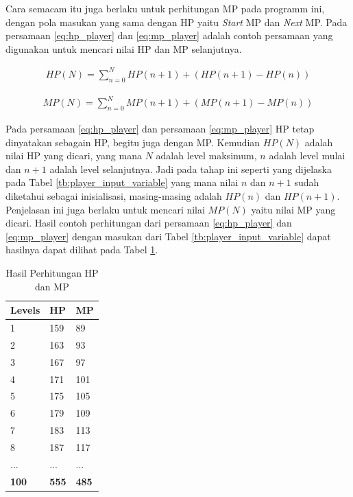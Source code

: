 Cara semacam itu juga berlaku untuk perhitungan MP pada programm ini, dengan pola masukan yang sama dengan HP yaitu \textit{Start} MP dan \textit{Next} MP. Pada persamaan \ref{eq:hp_player} dan \ref{eq:mp_player} adalah contoh persamaan yang digunakan untuk mencari nilai HP dan MP selanjutnya.
\vspace{1ex}

\begin{equation}\label{eq:hp_player}
	\begin{split}
		HP(N) = \sum_{n = 0}^{N} HP(n + 1) + \left(HP(n + 1) - HP(n) \right)
	\end{split}
\end{equation}

\begin{equation}\label{eq:mp_player}
	\begin{split}
		MP(N) = \sum_{n = 0}^{N} MP(n + 1) + \left(MP(n + 1) - MP(n) \right)
	\end{split}
\end{equation}
\vspace{1ex}

Pada persamaan \ref{eq:hp_player} dan persamaan \ref{eq:mp_player} HP tetap dinyatakan sebagain HP, begitu juga dengan MP. Kemudian $HP(N)$ adalah nilai HP yang dicari, yang mana $N$ adalah level maksimum, $n$ adalah level mulai dan $n + 1$ adalah level selanjutnya. Jadi pada tahap ini seperti yang dijelaska pada Tabel \ref{tb:player_input_variable} yang mana nilai $n$ dan $n + 1$ sudah diketahui sebagai inisialisasi, masing-masing adalah $HP(n)$ dan $HP(n + 1)$. Penjelasan ini juga berlaku untuk mencari nilai $MP(N)$ yaitu nilai MP yang dicari. Hasil contoh perhitungan dari persamaan \ref{eq:hp_player} dan \ref{eq:mp_player} dengan masukan dari Tabel \ref{tb:player_input_variable} dapat hasilnya dapat dilihat pada Tabel \ref{tb:player_hp_mp}. 
\vspace{1ex}

\begin{table}[h!]
	\centering
	\caption{Hasil Perhitungan HP dan MP}
	\label{tb:player_hp_mp}
	\begin{tabular}{|l|l|l|}
		\hline
		\rowcolor[HTML]{C0C0C0} 
		\textbf{Levels} & \textbf{HP} & \textbf{MP} \\ \hline
		1 & 159 & 89 \\ \hline
		2 & 163 & 93 \\ \hline
		3 & 167 & 97 \\ \hline
		4 & 171 & 101 \\ \hline
		5 & 175 & 105 \\ \hline
		6 & 179 & 109 \\ \hline
		7 & 183 & 113 \\ \hline
		8 & 187 & 117 \\ \hline
		... & ... & ... \\ \hline
		\textbf{100} & \textbf{555} & \textbf{485} \\ \hline
	\end{tabular}
\end{table}
\vspace{1ex}

